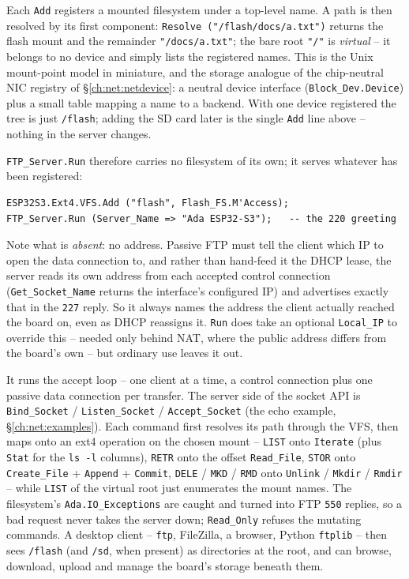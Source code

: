 Each \texttt{Add} registers a mounted filesystem under a top-level name. A path is
then resolved by its first component: \texttt{Resolve ("/flash/docs/a.txt")} returns
the flash mount and the remainder \texttt{"/docs/a.txt"}; the bare root \texttt{"/"}
is \emph{virtual} -- it belongs to no device and simply lists the registered names.
This is the Unix mount-point model in miniature, and the storage analogue of the
chip-neutral NIC registry of \S\ref{ch:net:netdevice}: a neutral device interface
(\texttt{Block\_Dev.Device}) plus a small table mapping a name to a backend. With
one device registered the tree is just \texttt{/flash}; adding the SD card later is
the single \texttt{Add} line above -- nothing in the server changes.

\texttt{FTP\_Server.Run} therefore carries no filesystem of its own; it serves
whatever has been registered:

\begin{lstlisting}
ESP32S3.Ext4.VFS.Add ("flash", Flash_FS.M'Access);
FTP_Server.Run (Server_Name => "Ada ESP32-S3");   -- the 220 greeting
\end{lstlisting}

Note what is \emph{absent}: no address. Passive FTP must tell the client which IP
to open the data connection to, and rather than hand-feed it the DHCP lease, the
server reads its own address from each accepted control connection
(\texttt{Get\_Socket\_Name} returns the interface's configured IP) and advertises
exactly that in the \texttt{227} reply. So it always names the address the client
actually reached the board on, even as DHCP reassigns it. \texttt{Run} does take an
optional \texttt{Local\_IP} to override this -- needed only behind NAT, where the
public address differs from the board's own -- but ordinary use leaves it out.

It runs the accept loop -- one client at a time, a control connection plus one
passive data connection per transfer. The server side of the socket API is
\texttt{Bind\_Socket} / \texttt{Listen\_Socket} / \texttt{Accept\_Socket} (the echo
example, \S\ref{ch:net:examples}). Each command first resolves its path through the
VFS, then maps onto an ext4 operation on the chosen mount -- \texttt{LIST} onto
\texttt{Iterate} (plus \texttt{Stat} for the \texttt{ls -l} columns), \texttt{RETR}
onto the offset \texttt{Read\_File}, \texttt{STOR} onto \texttt{Create\_File} +
\texttt{Append} + \texttt{Commit}, \texttt{DELE} / \texttt{MKD} / \texttt{RMD} onto
\texttt{Unlink} / \texttt{Mkdir} / \texttt{Rmdir} -- while \texttt{LIST} of the
virtual root just enumerates the mount names. The filesystem's
\texttt{Ada.IO\_Exceptions} are caught and turned into FTP \texttt{550} replies, so
a bad request never takes the server down; \texttt{Read\_Only} refuses the mutating
commands. A desktop client -- \texttt{ftp}, FileZilla, a browser, Python
\texttt{ftplib} -- then sees \texttt{/flash} (and \texttt{/sd}, when present) as
directories at the root, and can browse, download, upload and manage the board's
storage beneath them.

